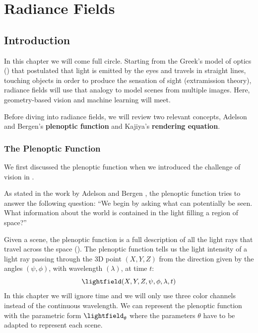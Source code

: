 
\chapter{Radiance Fields}
\label{chapter:nerfs}


\section{Introduction}


In this chapter we will come full circle. Starting from the Greek's model of optics (\chap{\ref{chap:challenge_of_vision}}) that postulated that light is emitted by the eyes and travels in straight lines, touching objects in order to produce the sensation of sight (extramission theory), radiance fields will use that analogy to model scenes from multiple images. Here, geometry-based vision and machine learning will meet. 

Before diving into radiance fields, we will review two relevant concepts, Adelson and Bergen's \textbf{plenoptic function} and Kajiya's \textbf{rendering equation}.

\subsection{The Plenoptic Function}

We first discussed the plenoptic function when we introduced the challenge of vision in \chap{\ref{chap:challenge_of_vision}}.

As stated in the work by Adelson and Bergen \cite{Adelson91}, the plenoptic function tries to answer the following question: ``We begin by asking what can potentially be seen. What
information about the world is contained in the light
filling a region of space?''


Given a scene, the plenoptic function is a full description of all the light rays that travel across the space (\fig{\ref{fig:nerfs:plenoptic_function}}). The plenoptic function tells us the light intensity of a light ray passing through the 3D point $(X, Y, Z)$ from the direction given by the angles $(\psi, \phi)$, with wavelength $(\lambda)$, at time $t$:
\begin{equation}
\lightfield (X, Y, Z, \psi, \phi, \lambda, t)
\end{equation}
In this chapter we will ignore time and we will only use three color channels instead of the continuous wavelength. We can represent the plenoptic function with the parametric form $\lightfield_{\theta}$ where the parameters $\theta$ have to be adapted to represent each scene. 


